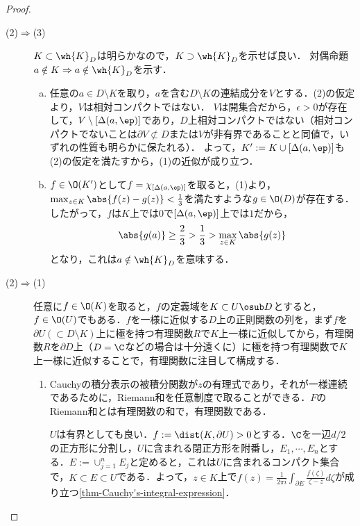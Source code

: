 \documentclass[uplatex, dvipdfmx]{jsreport}
\begin{document}
\begin{proof}
\begin{description}
\begin{enumerate}[(a)]
        \end{enumerate}
        \item[(2)$\Rightarrow$(3)] 
        $K\subset\wh{K}_D$は明らかなので，$K\supset\wh{K}_D$を示せば良い．
        対偶命題$a\notin K\Rightarrow a\notin\wh{K}_D$を示す．
        \begin{enumerate}[(a)]
            \item 任意の$a\in D\setminus K$を取り，$a$を含む$D\setminus K$の連結成分を$V$とする．(2)の仮定より，$V$は相対コンパクトではない．
            $V$は開集合だから，$\epsilon>0$が存在して，$V\setminus[\Delta(a,\ep)]$であり，$D$上相対コンパクトではない（相対コンパクトでないことは$\partial V\not\subset D$または$V$が非有界であることと同値で，いずれの性質も明らかに保たれる）．
            よって，$K':=K\cup[\Delta(a,\ep)]$も(2)の仮定を満たすから，(1)の近似が成り立つ．
            \item $f\in\O(K')$として$f=\chi_{[\Delta(a,\ep)]}$を取ると，(1)より，$\max_{z\in K}\abs{f(z)-g(z)}<\frac{1}{3}$を満たすような$g\in\O(D)$が存在する．したがって，$f$は$K$上では$0$で$[\Delta(a,\ep)]$上では$1$だから，
            \[\abs{g(a)}\ge\frac{2}{3}>\frac{1}{3}>\max_{z\in K}\abs{g(z)}\]
            となり，これは$a\notin\wh{K}_D$を意味する．
        \end{enumerate}
        \item[(2)$\Rightarrow$(1)] 
        任意に$f\in\O(K)$を取ると，$f$の定義域を$K\subset U\osub D$とすると，$f\in\O(U)$でもある．$f$を一様に近似する$D$上の正則関数の列を，まず$f$を$\partial U(\subset D\setminus K)$上に極を持つ有理関数$R$で$K$上一様に近似してから，有理関数$R$を$\partial D$上（$D=\C$などの場合は十分遠くに）に極を持つ有理関数で$K$上一様に近似することで，有理関数に注目して構成する．
        \begin{enumerate}
            \item Cauchyの積分表示の被積分関数が$z$の有理式であり，それが一様連続であるために，Riemann和を任意制度で取ることができる．$F$のRiemann和とは有理関数の和で，有理関数である．
            
            $U$は有界としても良い．$f:=\dist(K,\partial U)>0$とする．$\C$を一辺$d/2$の正方形に分割し，$U$に含まれる閉正方形を附番し，$E_1,\cdots,E_n$とする．$E:=\cup_{j=1}^nE_j$と定めると，これは$U$に含まれるコンパクト集合で，$K\subset E\subset U$である．よって，$z\in K$上で$f(z)=\frac{1}{2\pi i}\int_{\partial E}\frac{f(\zeta)}{\zeta-z}d\zeta$が成り立つ\ref{thm-Cauchy's-integral-expression}．


\end{enumerate}
\end{description}
\end{proof}
\end{document}
